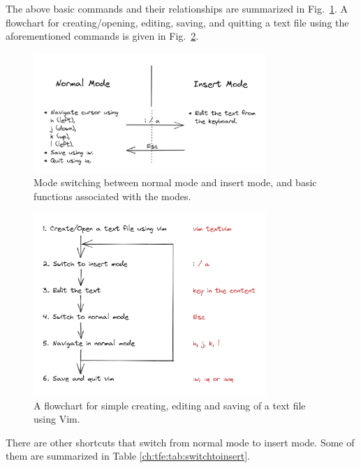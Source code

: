 The above basic commands and their relationships are summarized in Fig.~\ref{ch:tfe:fig:vimbasicmodeswitching}. A flowchart for creating/opening, editing, saving, and quitting a text file using the aforementioned commands is given in Fig.~\ref{ch:tfe:fig:vimbasicoperationflowchart}.

\begin{figure}[!htb]
\centering
\includegraphics[width=250pt]{chapters/part-1/figures/vimbasicmodeswitching.png}
\caption{Mode switching between normal mode and insert mode, and basic functions associated with the modes.} \label{ch:tfe:fig:vimbasicmodeswitching}
\end{figure}

\begin{figure}[!htb]
\centering
\includegraphics[width=250pt]{chapters/part-1/figures/vimbasicoperationflowchart.png}
\caption{A flowchart for simple creating, editing and saving of a text file using Vim.} \label{ch:tfe:fig:vimbasicoperationflowchart}
\end{figure}

There are other shortcuts that switch from normal mode to insert mode. Some of them are summarized in Table \ref{ch:tfe:tab:switchtoinsert}.


